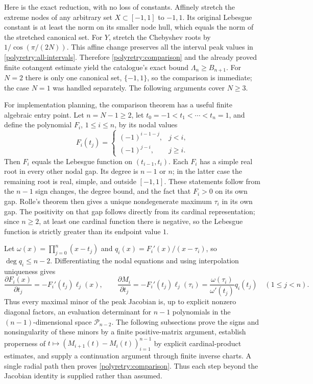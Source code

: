\documentclass[11pt]{article}
\theoremstyle{remark}\newtheorem{remark}[theorem]{Remark}
\begin{document}
Here is the exact reduction, with no loss of constants.  Affinely
stretch the extreme nodes of any arbitrary set $X\subset[-1,1]$ to
$-1,1$.  Its original Lebesgue constant is at least the norm on its
smaller node hull, which equals the norm of the stretched canonical
set.  For $Y$, stretch the Chebyshev roots by
$1/\cos(\pi/(2N))$.  This affine change preserves all the interval
peak values in \eqref{polyretry:all-intervals}.  Therefore
\eqref{polyretry:comparison} and the already proved finite cotangent
estimate yield the catalogue's exact bound $\Lambda_n\ge B_{n+1}$.
For $N=2$ there is only one canonical set, $\{-1,1\}$, so the
comparison is immediate; the case $N=1$ was handled separately.
The following arguments cover $N\ge3$.

For implementation planning, the comparison theorem has a useful
finite algebraic entry point.  Let $n=N-1\ge2$, let
$t_0=-1<t_1<\cdots<t_n=1$, and define the polynomial $F_i$,
$1\le i\le n$, by its nodal values
\[
 F_i(t_j)=
 \begin{cases}(-1)^{i-1-j},&j<i,\\(-1)^{j-i},&j\ge i.\end{cases}
\]
Then $F_i$ equals the Lebesgue function on $(t_{i-1},t_i)$.
Each $F_i$ has a simple real root in every other nodal gap.  Its
degree is $n-1$ or $n$; in the latter case the remaining root is
real, simple, and outside $[-1,1]$.  These statements follow from
the $n-1$ sign changes, the degree bound, and the fact that $F_i>0$
on its own gap.  Rolle's theorem then gives a unique nondegenerate
maximum $\tau_i$ in its own gap.  The positivity on that gap follows
directly from its cardinal representation; since $n\ge2$, at least
one cardinal function there is negative, so the Lebesgue function
is strictly greater than its endpoint value $1$.

Let $\omega(x)=\prod_{j=0}^n(x-t_j)$ and
$q_i(x)=F_i'(x)/(x-\tau_i)$, so $\deg q_i\le n-2$.
Differentiating the nodal equations and using interpolation
uniqueness gives
\[
 \frac{\partial F_i(x)}{\partial t_j}
       =-F_i'(t_j)\ell_j(x),
 \qquad
 \frac{\partial M_i}{\partial t_j}
       =-F_i'(t_j)\ell_j(\tau_i)
       =\frac{\omega(\tau_i)}{\omega'(t_j)}q_i(t_j)
       \quad(1\le j<n).
\]
Thus every maximal minor of the peak Jacobian is, up to explicit
nonzero diagonal factors, an evaluation determinant for $n-1$
polynomials in the $(n-1)$-dimensional space $\mathcal P_{n-2}$.
The following subsections prove the signs and nonsingularity of
these minors by a finite positive-matrix argument, establish
properness of $t\mapsto(M_{i+1}(t)-M_i(t))_{i=1}^{n-1}$ by
explicit cardinal-product estimates, and supply a continuation argument through finite inverse charts.
A single radial path then
proves \eqref{polyretry:comparison}.  Thus each step beyond the
Jacobian identity is supplied rather than assumed.
\end{document}
